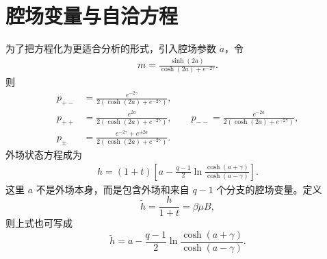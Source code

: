 \section{腔场变量与自洽方程}

为了把方程化为更适合分析的形式，引入腔场参数 \(a\)，令
\begin{align*}
	m=\frac{\sinh(2a)}{\cosh(2a)+e^{-2\gamma}}.
\end{align*}
则
\begin{align*}
	p_{+-}&=\frac{e^{-2\gamma}}
	{2\left(\cosh(2a)+e^{-2\gamma}\right)},\\
	p_{++}&=\frac{e^{2a}}
	{2\left(\cosh(2a)+e^{-2\gamma}\right)},\qquad
	p_{--}=\frac{e^{-2a}}
	{2\left(\cosh(2a)+e^{-2\gamma}\right)},\\
	p_\pm&=\frac{e^{-2\gamma}+e^{\pm2a}}
	{2\left(\cosh(2a)+e^{-2\gamma}\right)}.
\end{align*}
外场状态方程成为
\begin{align*}
	h=(1+t)\left[
	a-\frac{q-1}{2}
	\ln\frac{\cosh(a+\gamma)}{\cosh(a-\gamma)}
	\right].
\end{align*}
这里 \(a\) 不是外场本身，而是包含外场和来自 \(q-1\) 个分支的腔场变量。定义
\[
	\widetilde h=\frac{h}{1+t}=\beta\mu B,
\]
则上式也可写成
\[
	\widetilde h
	=a-\frac{q-1}{2}
	\ln\frac{\cosh(a+\gamma)}{\cosh(a-\gamma)}.
\]

